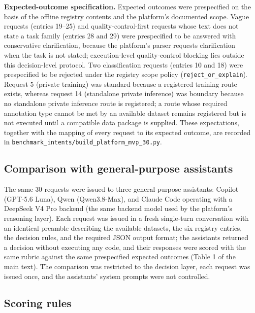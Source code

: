 \documentclass[final,5p,times,twocolumn]{elsarticle}
\begin{document}
\textbf{Expected-outcome specification.} Expected outcomes were prespecified on the basis of the offline registry contents and the platform's documented scope. Vague requests (entries 19--25) and quality-control-first requests whose text does not state a task family (entries 28 and 29) were prespecified to be answered with conservative clarification, because the platform's parser requests clarification when the task is not stated; execution-level quality-control blocking lies outside this decision-level protocol. Two classification requests (entries 10 and 18) were prespecified to be rejected under the registry scope policy (\texttt{reject\_or\_explain}). Request 5 (private training) was standard because a registered training route exists, whereas request 14 (standalone private inference) was boundary because no standalone private inference route is registered; a route whose required annotation type cannot be met by an available dataset remains registered but is not executed until a compatible data package is supplied. These expectations, together with the mapping of every request to its expected outcome, are recorded in \texttt{benchmark\_intents/build\_platform\_mvp\_30.py}.

\subsection{Comparison with general-purpose assistants}

The same 30 requests were issued to three general-purpose assistants: Copilot (GPT-5.6 Luna), Qwen (Qwen3.8-Max), and Claude Code operating with a DeepSeek V4 Pro backend (the same backend model used by the platform's reasoning layer). Each request was issued in a fresh single-turn conversation with an identical preamble describing the available datasets, the six registry entries, the decision rules, and the required JSON output format; the assistants returned a decision without executing any code, and their responses were scored with the same rubric against the same prespecified expected outcomes (Table 1 of the main text). The comparison was restricted to the decision layer, each request was issued once, and the assistants' system prompts were not controlled.


\subsection{Scoring rules}
\end{document}
